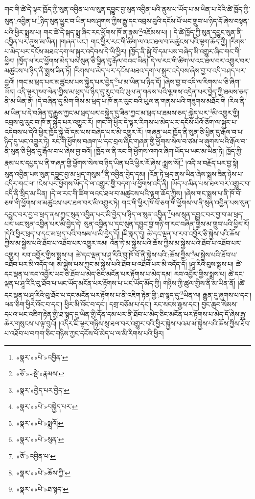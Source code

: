 གང་གི་ཚེ་དེ་ལྟར་ཁྱོད་ཀྱི་སུན་འབྱིན་པ་ལ་སུན་དབྱུང་བྱ་སུན་འབྱིན་པའི་ནུས་པ་ཡོད་པ་མ་ཡིན་པ་དེའི་ཚེ་ཁྱོད་ཀྱི་སུན་:འབྱིན་པ་\footnote{«སྣར་»«པེ་»འབྱིན་}ཉིད་སུན་ཕྱུང་བ་ཡིན་པས་ཤུགས་ཀྱིས་རྒྱུ་དང་འབྲས་བུའི་དངོས་པོ་ཡང་གྲུབ་པ་ཉིད་དོ་ཞེས་བསྟན་པའི་ཕྱིར་སྨྲས་པ། གང་ཚེ་དེ་སྐད་སྨྲ་ཞིང་རང་ཕྱོགས་ཁོ་ན་རྣམ་\footnote{«ཅོ་»«སྡེ་»རྣམས་}འཇོམས་པ། །
དེ་ཚེ་ཁྱོད་ཀྱི་སུན་དབྱུང་སུན་ནི་འབྱིན་པར་ནུས་མ་ཡིན། །གཞན་ཡང་། གང་ཕྱིར་རང་གི་ཚིག་ལ་འང་ཐལ་བ་མཚུངས་པའི་ལྟག་ཆོད་ཀྱི། །རིགས་པ་མེད་པར་དངོས་མཐའ་དག་ལ་སྐུར་འདེབས་དེ་ཡི་ཕྱིར། །ཁྱོད་ནི་སྐྱེ་བོ་དམ་པས་བཞེད་མི་འགྱུར་ཞིང་གང་གི་ཕྱིར། །ཁྱོད་ལ་རང་ཕྱོགས་མེད་པས་སུན་ཅི་ཕྱིན་དུ་རྒོལ་བའང་ཡིན། དེ་ལ་རང་གི་ཚིག་ལ་འང་ཐལ་བར་འགྱུར་བར་མཚུངས་པ་ཉིད་ནི་སྨྲས་ཟིན་ཏོ། །རིགས་པ་མེད་པར་དངོས་མཐའ་དག་ལ་སྐུར་འདེབས་ཞེས་བྱ་བ་འདི་བཤད་པར་བྱའོ། །གང་མ་ཕྲད་པར་མཚུངས་པས་སྐྱེད་པར་བྱེད་\footnote{«སྣར་»བྱེད་པར་བྱེད་}པ་མ་ཡིན་པ་ཉིད་དོ། །ཞེས་བྱ་བ་འདི་ལ་རིགས་པ་ཅི་ཞིག་ཡོད། འདི་ལྟར་ཁབ་ལེན་གྱིས་མ་ཕྲད་པ་ཉིད་དུ་རུང་བའི་ཡུལ་ན་གནས་པའི་ལྕགས་འདྲེན་པར་བྱེད་ཀྱི་ཐམས་ཅད་ནི་མ་ཡིན་ནོ། །དེ་བཞིན་དུ་མིག་གིས་མ་ཕྲད་པ་ཁོ་ནར་རུང་བའི་ཡུལ་ན་གནས་པའི་གཟུགས་མཐོང་གི །རིལ་ནི་མ་ཡིན་པ་དེ་བཞིན་དུ་རྒྱུས་ཀྱང་མ་ཕྲད་པར་བསྐྱེད་དུ་ཟིན་ཀྱང་མ་ཕྲད་པ་ཐམས་ཅད་:སྐྱེད་པར་\footnote{«སྣར་»«པེ་»བསྐྱེད་པར་}མི་འགྱུར་གྱི། འབྲས་བུ་རུང་བ་ཁོ་ན་སྐྱེད་པར་འགྱུར་རོ། །གང་གི་ཕྱིར་དེ་ལྟར་རིགས་པ་མེད་པར་དངོས་པོའོ་ཅོག་ལ་སྐུར་པ་འདེབས་པ་དེའི་ཕྱིར་ཁྱོད་སྐྱེ་བོ་དམ་པས་བཞེད་པར་མི་འགྱུར་རོ། །གཞན་ཡང་ཁྱོད་ནི་སུན་ཅི་ཕྱིན་དུ་རྒོལ་བ་པ་ཉིད་དུ་ཡང་འགྱུར་ཏེ། རང་གི་ཕྱོགས་བཞག་པ་དང་བྲལ་ཞིང་གཞན་གྱི་ཕྱོགས་སེལ་བ་ཙམ་ལ་ཞུགས་པའི་རྒོལ་བ་ནི་སུན་ཅི་ཕྱིན་དུ་རྒོལ་བ་པ་ཞེས་བྱ་བའོ། །ཁྱོད་ལ་ནི་རང་གི་ཕྱོགས་འགའ་ཞིག་ཡོད་པ་ཡང་མ་ཡིན་ཏེ། ཁྱོད་ཀྱི་རྣམ་པར་དཔྱད་པ་ནི་གཞན་གྱི་ཕྱོགས་སེལ་བ་ཉིད་ཡིན་པའི་ཕྱིར་རོ་ཞེས་:སྨྲས་སོ།\footnote{«སྣར་»«པེ་»སྨྲའོ།} །འདི་ལ་བརྗོད་པར་བྱ་སྟེ། སུན་འབྱིན་པས་སུན་དབྱུང་བྱ་མ་ཕྲད་གསུམ་\footnote{«སྣར་»«པེ་»སུན་}ནི་འབྱིན་བྱེད་དམ། །འོན་ཏེ་ཕྲད་ནས་ཡིན་ཞེས་སྨྲས་ཟིན་ཉེས་པ་འདིར་གང་ལ། །ངེས་པར་ཕྱོགས་ཡོད་དེ་ལ་འགྱུར་གྱི་བདག་ལ་ཕྱོགས་འདི་ནི། །ཡོད་པ་མིན་པས་ཐལ་བར་འགྱུར་བ་འདི་ནི་སྲིད་མ་ཡིན། །དེ་ལ་རང་གི་ཚིག་ལའང་ཐལ་བ་མཚུངས་པའི་ལྟག་ཆོད་ཀྱིས། །ཞེས་གང་སྨྲས་པ་ནི་ཁོ་བོ་ཅག་གི་ཕྱོགས་ལ་མཚུངས་པར་ཐལ་བར་མི་འགྱུར་ཏེ། གང་གི་ཕྱིར་ཁོ་བོ་ཅག་གི་ཕྱོགས་ལ་ནི་སུན་འབྱིན་པས་སུན་དབྱུང་བར་བྱ་བ་ཕྲད་ནས་ཀྱང་སུན་འབྱིན་པར་མི་བྱེད་པ་ཉིད་ལ་སུན་འབྱིན་\footnote{«ཅོ་»འབྱིན་པ་}པས་སུན་དབྱུང་བར་བྱ་བ་མ་ཕྲད་པར་ཡང་སུན་འབྱིན་པར་མི་བྱེད་དེ། སུན་འབྱིན་པ་དང་སུན་དབྱུང་བྱ་གཉི་ག་རང་བཞིན་གྱིས་མ་གྲུབ་པའི་ཕྱིར་རོ། །དེའི་ཕྱིར་ཕྲད་པ་དང་མ་ཕྲད་པའི་བསམ་པ་མི་བྱེད་དོ། །ཇི་སྐད་དུ། ཚེ་དང་ལྡན་པ་རབ་འབྱོར་ཅི་སྐྱེས་པའི་ཆོས་ཀྱིས་མ་སྐྱེས་པའི་ཐོབ་པ་འཐོབ་པར་འགྱུར་རམ། འོན་ཏེ་མ་སྐྱེས་པའི་ཆོས་ཀྱིས་མ་སྐྱེས་པའི་ཐོབ་པ་འཐོབ་པར་འགྱུར། རབ་འབྱོར་གྱིས་སྨྲས་པ། ཚེ་དང་ལྡན་པ་ཤཱ་རིའི་བུ་ཁོ་བོ་ནི་སྐྱེས་པའི་:ཆོས་ཀྱིས་\footnote{«སྣར་»«པེ་»ཆོས་ཀྱི་}མ་སྐྱེས་པའི་ཐོབ་པ་འཐོབ་པར་མི་འདོད་ལ། མ་སྐྱེས་པས་ཀྱང་མ་སྐྱེས་པའི་ཐོབ་པ་འཐོབ་པར་མི་འདོད་དོ། །ཤཱ་རིའི་བུས་སྨྲས་པ། ཚེ་དང་ལྡན་པ་རབ་འབྱོར་ཡང་ཅི་ཐོབ་པ་མེད་ཅིང་མངོན་པར་རྟོགས་པ་མེད་དམ། རབ་འབྱོར་གྱིས་སྨྲས་པ། ཚེ་དང་ལྡན་པ་ཤཱ་རིའི་བུ་ཐོབ་པ་ཡང་ཡོད་མངོན་པར་རྟོགས་པ་ཡང་ཡོད་མོད་ཀྱི། གཉིས་ཀྱི་ཚུལ་གྱིས་ནི་མ་ཡིན་ནོ། །ཚེ་དང་ལྡན་པ་ཤཱ་རིའི་བུ་ཐོབ་པ་དང་མངོན་པར་རྟོགས་པ་ནི་འཇིག་རྟེན་གྱི་:ཐ་སྙད་དུ་\footnote{«སྣར་»«པེ་»ཐ་སྙད་}ཡིན་ལ། རྒྱུན་དུ་ཞུགས་པ་དང་། ལན་ཅིག་ཕྱིར་འོང་བ་དང་། ཕྱིར་མི་འོང་བ་དང་། དགྲ་བཅོམ་པ་དང་། རང་སངས་རྒྱས་དང་། བྱང་ཆུབ་སེམས་དཔའ་ཡང་འཇིག་རྟེན་གྱི་ཐ་སྙད་དུ་ཡིན་གྱི་དོན་དམ་པར་ནི་ཐོབ་པ་མེད་ཅིང་མངོན་པར་རྟོགས་པ་མེད་དོ་ཞེས་རྒྱ་ཆེར་གསུངས་པ་ལྟ་བུའོ། །འདིར་ཇི་ལྟར་གཉིས་སུ་ཐལ་བར་འགྱུར་བའི་ཕྱིར་སྐྱེས་པའམ་མ་སྐྱེས་པའི་ཆོས་ཀྱིས་ཐོབ་པ་འཐོབ་པ་བཀག་ཅིང་གཉིས་ཀྱང་དངོས་པོ་མེད་པ་ལ་མི་རིགས་པའི་ཕྱིར། 